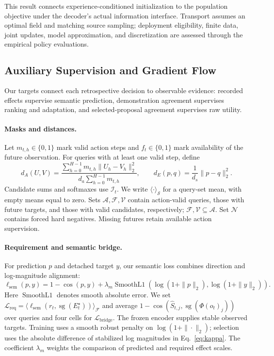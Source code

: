 This result connects experience-conditioned initialization to the population objective under the decoder's actual information interface.
Transport assumes an optimal field and matching source sampling; deployment eligibility, finite data, joint updates, model approximation, and discretization are assessed through the empirical policy evaluations.

\subsection{Auxiliary Supervision and Gradient Flow}
\label{app:learning_details}

Our targets connect each retrospective decision to observable evidence: recorded effects supervise semantic prediction, demonstration agreement supervises ranking and adaptation, and selected-proposal agreement supervises raw utility.

\paragraph{Masks and distances.}
Let $m_{t,h}\in\{0,1\}$ mark valid action steps and $f_t\in\{0,1\}$ mark availability of the future observation.
For queries with at least one valid step, define
\begin{equation}
 d_A(U,V)=\frac{\sum_{h=0}^{H-1}m_{t,h}\|U_h-V_h\|_2^2}{d_a\sum_{h=0}^{H-1}m_{t,h}},
 \qquad d_E(p,q)=\frac1{d_s}\|p-q\|_2^2.
 \label{eq:distances}
\end{equation}
Candidate sums and softmaxes use $\mathcal I_t$.
We write $\langle\cdot\rangle_{\mathcal S}$ for a query-set mean, with empty means equal to zero.
Sets $\mathcal A,\mathcal F,\mathcal V$ contain action-valid queries, those with future targets, and those with valid candidates, respectively; $\mathcal F,\mathcal V\subseteq\mathcal A$.
Set $\mathcal N$ contains forced hard negatives.
Missing futures retain available action supervision.

\paragraph{Requirement and semantic bridge.}
For prediction $p$ and detached target $y$, our semantic loss combines direction and log-magnitude alignment:
\begin{equation}
 \ell_{\mathrm{sem}}(p,y)=1-\cos(p,y)+\lambda_m\operatorname{SmoothL1}
 \!\left(\log(1+\|p\|_2),\log(1+\|y\|_2)\right).
 \label{eq:semantic_loss}
\end{equation}
Here $\operatorname{SmoothL1}$ denotes smooth absolute error.
We set $\mathcal L_{\mathrm{req}}=\langle\ell_{\mathrm{sem}}(r_t,\operatorname{sg}(E_t^\star))\rangle_{\mathcal F}$ and average $1-\cos(\widehat S_{t,j},\operatorname{sg}(\Phi(o_t)_j))$ over queries and four cells for $\mathcal L_{\mathrm{bridge}}$.
The frozen encoder supplies stable observed targets. Training uses a smooth robust penalty on $\log(1+\|\cdot\|_2)$; selection uses the absolute difference of stabilized log magnitudes in Eq.~\eqref{eq:kappa}. The coefficient $\lambda_m$ weights the comparison of predicted and required effect scales.

